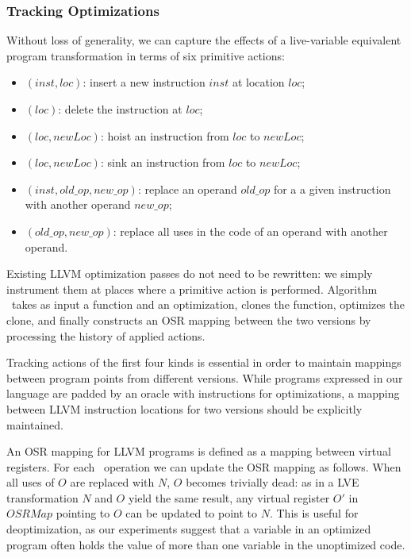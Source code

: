 \subsubsection*{Tracking Optimizations}
Without loss of generality, we can capture the effects of a live-variable equivalent program transformation in terms of six primitive actions:
\begin{itemize}[parsep=0pt,partopsep=0pt]
 \item {}$(inst, loc)$: insert a new instruction $inst$ at location $loc$;
 \item {}$(loc)$: delete the instruction at $loc$;
 \item {}$(loc, newLoc)$: hoist an instruction from $loc$ to $newLoc$;
 \item {}$(loc, newLoc)$: sink an instruction from $loc$ to $newLoc$;
 \item {}$(inst, old\_op, new\_op)$: replace an operand $old\_op$ for a a given instruction with another operand $new\_op$;
 \item {}$(old\_op, new\_op)$: replace all uses in the code of an operand with another operand.
\end{itemize}

\noindent Existing LLVM optimization passes do not need to be rewritten: we simply instrument them at places where a primitive action is performed. Algorithm \apply\ takes as input a function and an optimization, clones the function, optimizes the clone, and finally constructs an OSR mapping between the two versions by processing the history of applied actions.

Tracking actions of the first four kinds is essential in order to maintain mappings between program points from different versions. While programs expressed in our language are padded by an oracle with  instructions for optimizations, a mapping between LLVM instruction locations for two versions should be explicitly maintained.

An OSR mapping for LLVM programs is defined as a mapping between virtual registers. For each \RAUWfull\ operation we can update the OSR mapping as follows. When all uses of $O$ are replaced with $N$, $O$ becomes trivially dead: as in a LVE transformation $N$ and $O$ yield the same result, any virtual register $O'$ in $OSRMap$ pointing to $O$ can be updated to point to $N$. This is useful for deoptimization, as our experiments suggest that a variable in an optimized program often holds the value of more than one variable in the unoptimized code.

